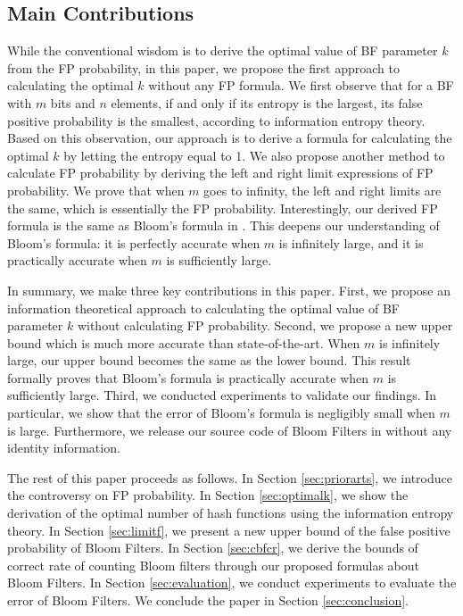 \subsection{Main Contributions}\postsub
While the conventional wisdom is to derive the optimal value of BF parameter $k$ from the FP probability, in this paper, we propose the first approach to calculating the optimal $k$ without any FP formula.
%
We first observe that for a BF with $m$ bits and $n$ elements, if and only if its entropy is the largest, its false positive probability is the smallest, according to information entropy theory.
%
Based on this observation, our approach is to derive a formula for calculating the optimal $k$ by letting the entropy equal to 1.
%
We also propose another method to calculate FP probability by deriving the left and right limit expressions of FP probability.
%
We prove that when $m$ goes to infinity, the left and right limits are the same, which is essentially the FP probability.
%
Interestingly, our derived FP formula is the same as Bloom's formula in \cite{BF1970}.
%
This deepens our understanding of Bloom's formula: it is perfectly accurate when $m$ is infinitely large, and it is practically accurate when $m$ is sufficiently large.

In summary, we make three key contributions in this paper.
%
First, we propose an information theoretical approach to calculating the optimal value of BF parameter $k$ without calculating FP probability.
%
Second, we propose a new upper bound which is much more accurate than state-of-the-art.
%
When $m$ is infinitely large, our upper bound becomes the same as the lower bound.
%
This result formally proves that Bloom's formula is practically accurate when $m$ is sufficiently large.
%
Third, we conducted experiments to validate our findings.
%
In particular, we show that the error of Bloom's formula is negligibly small when $m$ is large.
%
Furthermore, we release our source code of Bloom Filters in \cite{opensource} without any identity information.

%
The rest of this paper proceeds as follows.
%
In Section \ref{sec:priorarts}, we introduce the controversy on FP probability.
%
In Section \ref{sec:optimalk}, we show the derivation of the optimal number of hash functions using the information entropy theory.
%
In Section \ref{sec:limitf}, we present a new upper bound of the false positive probability of Bloom Filters.
%
In Section \ref{sec:cbfcr}, we derive the bounds of correct rate of counting Bloom filters through our proposed formulas about Bloom Filters. 
%
In Section \ref{sec:evaluation}, we conduct experiments to evaluate the error of Bloom Filters.
%
%
We conclude the paper in Section \ref{sec:conclusion}.